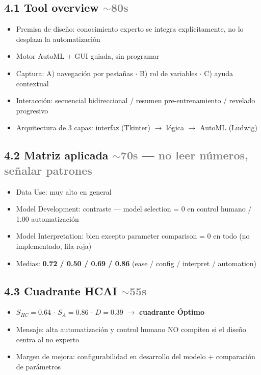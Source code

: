 \documentclass[10pt,a4paper]{article}
\newcommand{\tiempo}[1]{\hfill\normalfont\small\textcolor{gray}{$\sim$#1}}
\newcommand{\clave}[1]{\textbf{#1}}
\begin{document}
\subsection*{4.1 Tool overview \tiempo{80s}}
\begin{itemize}
    \item Premisa de diseño: conocimiento experto se integra explícitamente, no lo desplaza la automatización
    \item Motor AutoML + GUI guiada, sin programar
    \item Captura: A) navegación por pestañas $\cdot$ B) rol de variables $\cdot$ C) ayuda contextual
    \item Interacción: secuencial bidireccional / resumen pre-entrenamiento / revelado progresivo
    \item Arquitectura de 3 capas: interfaz (Tkinter) $\rightarrow$ lógica $\rightarrow$ AutoML (Ludwig)
\end{itemize}

\subsection*{4.2 Matriz aplicada \tiempo{70s} --- \textcolor{gray}{\small no leer números, señalar patrones}}
\begin{itemize}
    \item Data Use: muy alto en general
    \item Model Development: contraste --- model selection = 0 en control humano / 1.00 automatización
    \item Model Interpretation: bien excepto parameter comparison = 0 en todo (no implementado, fila roja)
    \item Medias: \clave{0.72 / 0.50 / 0.69 / 0.86} (ease / config / interpret / automation)
\end{itemize}

\subsection*{4.3 Cuadrante HCAI \tiempo{55s}}
\begin{itemize}
    \item $S_{HC}=0.64$ $\cdot$ $S_A=0.86$ $\cdot$ $D=0.39$ $\rightarrow$ \textbf{cuadrante Óptimo}
    \item Mensaje: alta automatización y control humano NO compiten si el diseño centra al no experto
    \item Margen de mejora: configurabilidad en desarrollo del modelo + comparación de parámetros
\end{itemize}
\end{document}
